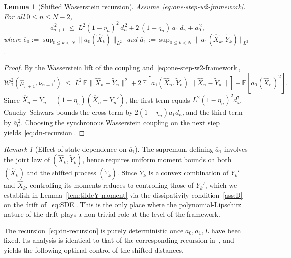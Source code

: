 \documentclass[11pt,a4paper,reqno]{amsart}
\theoremstyle{plain}
\newtheorem{lemma}{Lemma}
\theoremstyle{definition}
\theoremstyle{remark}
\newtheorem{remark}{Remark}
\newcommand{\E}{\mathbb{E}}
\newcommand{\W}{\mathcal{W}_2}
\begin{document}
\begin{lemma}[Shifted Wasserstein recursion]
\label{lem:shifted-recursion}
Assume~\eqref{eq:one-step-w2-framework}. For all $0\le n\le N-2$,
\begin{equation}\label{eq:dn-recursion}
  d_{n+1}^{\,2}
  \;\le\;
  L^{2}(1-\eta_n)^{2}\,d_n^{\,2}
  +2\,(1-\eta_n)\,\overline a_1\,d_n
  +\overline a_0^{\,2},
\end{equation}
where
$\overline a_0:=\sup_{0\le k<N}\|a_0(\widehat X_k)\|_{L^{2}}$
and
$\overline a_1:=\sup_{0\le k<N}\|a_1(\widehat X_k,\widetilde Y_k)\|_{L^{2}}$.
\end{lemma}

\begin{proof}
By the Wasserstein lift of the coupling
and~\eqref{eq:one-step-w2-framework},
\[
  \W^{2}(\widehat\mu_{n+1},\nu_{n+1}')
  \;\le\;
  L^{2}\,\E\|\widehat X_n-\widetilde Y_n\|^{2}
  +2\,\E\!\left[a_1(\widehat X_n,\widetilde Y_n)\,\|\widehat X_n-\widetilde Y_n\|\right]
  +\E\!\left[a_0(\widehat X_n)^{2}\right].
\]
Since $\widehat X_n-\widetilde Y_n=(1-\eta_n)(\widehat X_n-Y_n')$, the
first term equals $L^2(1-\eta_n)^2 d_n^2$, Cauchy--Schwarz bounds the
cross term by $2(1-\eta_n)\overline a_1 d_n$, and the third term
by $\overline a_0^{\,2}$. Choosing the synchronous Wasserstein coupling
on the next step yields~\eqref{eq:dn-recursion}.
\end{proof}

\begin{remark}[Effect of state-dependence on $\overline a_1$]
\label{rem:state-dependence-effect}
The supremum defining $\overline a_1$ involves the joint law of
$(\widehat X_k,\widetilde Y_k)$, hence requires uniform moment bounds on
both $(\widehat X_k)$ and the shifted process $(\widetilde Y_k)$. Since
$\widetilde Y_k$ is a convex combination of $Y_k'$ and $\widehat X_k$,
controlling its moments reduces to controlling those of $Y_k'$, which
we establish in
Lemma~\ref{lem:tildeY-moment} via the dissipativity condition~\ref{ass:D} on the drift of~\eqref{eq:SDE}. This is the only place where the
polynomial-Lipschitz nature of the drift plays a non-trivial role at
the level of the framework.
\end{remark}

The recursion~\eqref{eq:dn-recursion} is purely deterministic once
$\overline a_0,\overline a_1,L$ have been fixed. Its analysis is
identical to that of the corresponding recursion
in~\cite[Lemma~B.5]{chewi2024local}, and yields the following optimal
control of the shifted distances.
\end{document}
